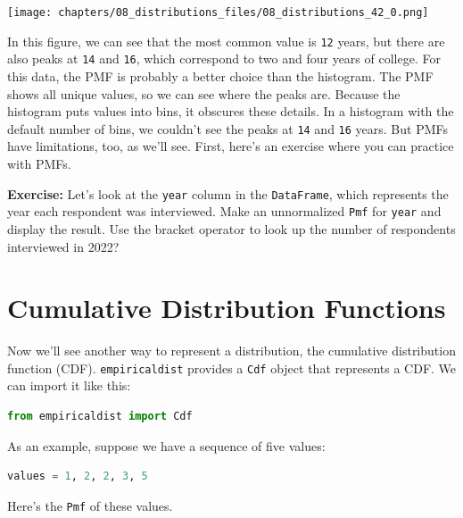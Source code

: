 \begin{center}
\texttt{[image: chapters/08\_distributions\_files/08\_distributions\_42\_0.png]}
\end{center}

In this figure, we can see that the most common value is
\passthrough{\lstinline!12!} years, but there are also peaks at
\passthrough{\lstinline!14!} and \passthrough{\lstinline!16!}, which
correspond to two and four years of college. For this data, the PMF is
probably a better choice than the histogram. The PMF shows all unique
values, so we can see where the peaks are. Because the histogram puts
values into bins, it obscures these details. In a histogram with the
default number of bins, we couldn't see the peaks at
\passthrough{\lstinline!14!} and \passthrough{\lstinline!16!} years. But
PMFs have limitations, too, as we'll see. First, here's an exercise
where you can practice with PMFs.

\textbf{Exercise:} Let's look at the \passthrough{\lstinline!year!}
column in the \passthrough{\lstinline!DataFrame!}, which represents the
year each respondent was interviewed. Make an unnormalized
\passthrough{\lstinline!Pmf!} for \passthrough{\lstinline!year!} and
display the result. Use the bracket operator to look up the number of
respondents interviewed in 2022?

\hypertarget{cumulative-distribution-functions}{%
\section{Cumulative Distribution
Functions}\label{cumulative-distribution-functions}}

Now we'll see another way to represent a distribution, the cumulative
distribution function (CDF). \passthrough{\lstinline!empiricaldist!}
provides a \passthrough{\lstinline!Cdf!} object that represents a CDF.
We can import it like this:

\begin{lstlisting}[language=Python,style=source]
from empiricaldist import Cdf
\end{lstlisting}

As an example, suppose we have a sequence of five values:

\begin{lstlisting}[language=Python,style=source]
values = 1, 2, 2, 3, 5  
\end{lstlisting}

Here's the \passthrough{\lstinline!Pmf!} of these values.

